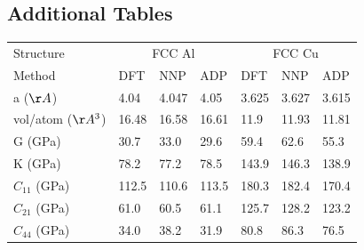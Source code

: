 \documentclass{article}
\begin{document}
\subsection{Additional Tables} \label{sct:adn_solsol}
\begin{tabular}{l|lll|lll}%
\hline%
Structure&\multicolumn{3}{c}{FCC Al}&\multicolumn{3}{c}{FCC Cu}\\%
Method&DFT&NNP&ADP&DFT&NNP&ADP\\%
\hline%
a ($\AA$)&4.04&4.047&4.05&3.625&3.627&3.615\\%
vol/atom ($\AA^3$)&16.48&16.58&16.61&11.9&11.93&11.81\\%
G (GPa)&30.7&33.0&29.6&59.4&62.6&55.3\\%
K (GPa)&78.2&77.2&78.5&143.9&146.3&138.9\\%
$C_{11}$ (GPa)&112.5&110.6&113.5&180.3&182.4&170.4\\%
$C_{21}$ (GPa)&61.0&60.5&61.1&125.7&128.2&123.2\\%
$C_{44}$ (GPa)&34.0&38.2&31.9&80.8&86.3&76.5\\%
\hline%
\end{tabular}%
\newline%
\newline%
\newline%
\newline%
\end{document}
